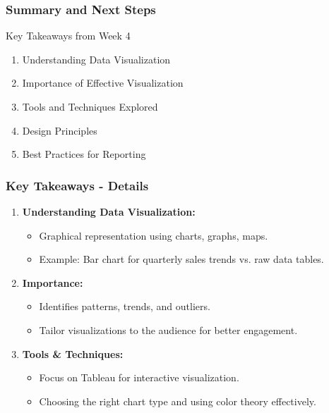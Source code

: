 \documentclass[aspectratio=169]{beamer}
\begin{document}
\begin{frame}[fragile]
    \frametitle{Summary and Next Steps}
    \begin{block}{Key Takeaways from Week 4}
        \begin{enumerate}
            \item Understanding Data Visualization
            \item Importance of Effective Visualization
            \item Tools and Techniques Explored
            \item Design Principles
            \item Best Practices for Reporting
        \end{enumerate}
    \end{block}
\end{frame}

\begin{frame}[fragile]
    \frametitle{Key Takeaways - Details}
    \begin{enumerate}
        \item \textbf{Understanding Data Visualization:}
            \begin{itemize}
                \item Graphical representation using charts, graphs, maps.
                \item Example: Bar chart for quarterly sales trends vs. raw data tables.
            \end{itemize}
        \item \textbf{Importance:}
            \begin{itemize}
                \item Identifies patterns, trends, and outliers.
                \item Tailor visualizations to the audience for better engagement.
            \end{itemize}
        \item \textbf{Tools & Techniques:}
            \begin{itemize}
                \item Focus on Tableau for interactive visualization.
                \item Choosing the right chart type and using color theory effectively.
            \end{itemize}
    \end{enumerate}
\end{frame}
\end{document}
